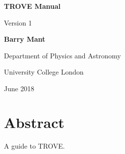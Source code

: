 \documentclass[oneside,chapterprefix=on,12pt,parskip=full,bibliography=totoc]{scrbook}  %
\numberwithin{equation}{section}
\begin{document}
\begin{titlepage}
\centering
\vspace*{1in}
\begin{Large}\bfseries
TROVE Manual\par
\end{Large}
Version 1 \par
\vspace{1.5in}
\begin{large}\bfseries
Barry Mant\par
\end{large}
\vfill
\vspace{0.5in}
Department of Physics and Astronomy
\par
University College London
\par
\vspace{0.5in}
June 2018
\par
\end{titlepage}


\frontmatter



\chapter{Abstract}
A guide to TROVE.




\doublespacing        %
\tableofcontents

\mainmatter
\onehalfspacing      %













%


\backmatter


\newpage


\end{document}
